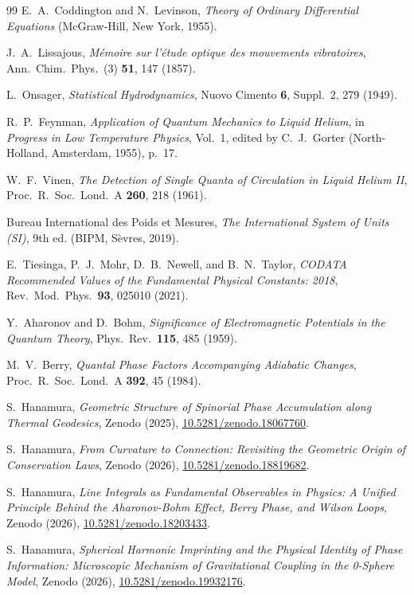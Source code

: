 \documentclass[%
 reprint, amsmath,amssymb, aps, prb, ]{revtex4-2}
\numberwithin{equation}{section}
\begin{document}
\begin{thebibliography}{99}
E.~A.~Coddington and N.~Levinson,
\emph{Theory of Ordinary Differential Equations}
(McGraw-Hill, New York, 1955).

J.~A.~Lissajous,
\emph{M\'emoire sur l'\'etude optique des mouvements vibratoires},
Ann.~Chim.~Phys.\ (3) \textbf{51}, 147 (1857).

L.~Onsager,
\emph{Statistical Hydrodynamics},
Nuovo Cimento \textbf{6}, Suppl.~2, 279 (1949).

R.~P.~Feynman,
\emph{Application of Quantum Mechanics to Liquid Helium},
in \emph{Progress in Low Temperature Physics}, Vol.~1, edited by C.~J.~Gorter (North-Holland, Amsterdam, 1955), p.~17.

W.~F.~Vinen,
\emph{The Detection of Single Quanta of Circulation in Liquid Helium II},
Proc.~R.~Soc.~Lond.~A \textbf{260}, 218 (1961).

Bureau International des Poids et Mesures,
\emph{The International System of Units (SI)}, 9th ed.
(BIPM, S\`evres, 2019).

E.~Tiesinga, P.~J.~Mohr, D.~B.~Newell, and B.~N.~Taylor,
\emph{CODATA Recommended Values of the Fundamental Physical Constants: 2018},
Rev.~Mod.~Phys.\ \textbf{93}, 025010 (2021).

Y.~Aharonov and D.~Bohm,
\emph{Significance of Electromagnetic Potentials in the Quantum Theory},
Phys.~Rev.\ \textbf{115}, 485 (1959).

M.~V.~Berry,
\emph{Quantal Phase Factors Accompanying Adiabatic Changes},
Proc.~R.~Soc.~Lond.~A \textbf{392}, 45 (1984).

S.~Hanamura,
\emph{Geometric Structure of Spinorial Phase Accumulation along Thermal Geodesics},
Zenodo (2025), \href{https://doi.org/10.5281/zenodo.18067760}{10.5281/zenodo.18067760}.

S.~Hanamura,
\emph{From Curvature to Connection: Revisiting the Geometric Origin of Conservation Laws},
Zenodo (2026), \href{https://doi.org/10.5281/zenodo.18819682}{10.5281/zenodo.18819682}.

S.~Hanamura,
\emph{Line Integrals as Fundamental Observables in Physics: A Unified Principle Behind the Aharonov-Bohm Effect, Berry Phase, and Wilson Loops},
Zenodo (2026), \href{https://doi.org/10.5281/zenodo.18203433}{10.5281/zenodo.18203433}.

S.~Hanamura,
\emph{Spherical Harmonic Imprinting and the Physical Identity of Phase Information: Microscopic Mechanism of Gravitational Coupling in the 0-Sphere Model},
Zenodo (2026), \href{https://doi.org/10.5281/zenodo.19932176}{10.5281/zenodo.19932176}.


\end{thebibliography}
\end{document}
